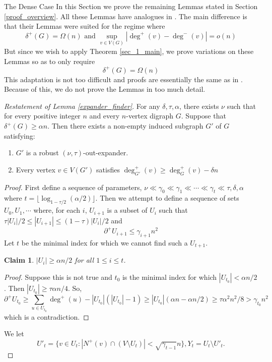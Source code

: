 \documentclass[11pt,a4paper]{article}
\newtheorem{claim}[subsection]{Claim}
\begin{document}
\begin{section}{The Dense Case}
In this Section we prove the remaining Lemmas stated in Section \ref{proof_overview}. All these Lemmas have analogues in \cite{BFMPY}. The main difference is that their Lemmas were suited for the regime where
\[
	\delta^{+ }(G) = \Omega(n) \text{ and } \sup_{v \in V(G)} |\deg^{+}(v) - \deg^{-}(v) | = o(n)
\]
But since we wish to apply Theorem \ref{sec_1_main}, we prove variations on these Lemmas so as to only require
\[
	\delta^{+ }(G) = \Omega(n)
\]
This adaptation is not too difficult and proofs are essentially the same as in \cite{BFMPY}. Because of this, we do not prove the Lemmas in too much detail.

\medskip

\textit{Restatement of Lemma \ref{expander_finder}}. For any $\delta, \tau, \alpha$, there exists $\nu$ such that for every positive integer $n$ and every $n$-vertex digraph $G$. Suppose that $\delta^{+}(G) \geq \alpha n$. Then there exists a non-empty induced subgraph $G'$ of $G$ satisfying:
\begin{enumerate}
\item[A1] $G'$ is a robust $(\nu, \tau)$-out-expander.
\item[A2] Every vertex $v \in V(G')$ satisfies $\deg^{+}_{G'}(v) \geq \deg^+_{G}(v) - \delta n$
\end{enumerate}
\begin{proof}
First define a sequence of parameters, $\nu \ll \gamma_0 \ll \gamma_1 \ll \cdots \ll  \gamma_t \ll \tau, \delta, \alpha$ where $t = \lfloor \log_{1 - \tau/2}(\alpha/2) \rfloor$. Then we attempt to define a sequence of sets $U_0, U_1, \cdots $ where, for each $i$, $U_{i + 1}$ is a subset of $U_i$ such that $\tau |U_i|/2 \leq |U_{i + 1} | \leq (1 - \tau) |U_i|/2 $ and
\[
\partial^+ U_{i + 1} \leq \gamma_{i + 1} n^2
\]
Let $t$ be the minimal index for which we cannot find such a $U_{t + 1}$.
\begin{claim} $|U_i| \geq \alpha n /2$ for all $1 \leq i \leq t$.
\end{claim}
\begin{proof} Suppose this is not true and $t_0$ is the minimal index for which $|U_{t_0}| < \alpha n/2$. Then $|U_{t_0}| \geq \tau \alpha n/4$. So,
\[
\partial^+ U_{t_0} \geq \sum_{u \in U_{t_0} } \deg^+ (u) - |U_{t_0}|  ( |U_{t_0}| - 1 ) \geq |U_{t_0} | ( \alpha n - \alpha n/2 ) \geq \tau \alpha^2 n^2/8 > \gamma_{t_0} n^2
\]
which is a contradiction.
\end{proof}
We let
\[
U'_t = \{ v \in U_t : |N^{+} (v) \cap (V \setminus U_t) | < \sqrt { \gamma_{t - 1 } } n \}, Y_t = U_t \setminus U'_t.
\]
\end{proof}
\end{section}
\end{document}
